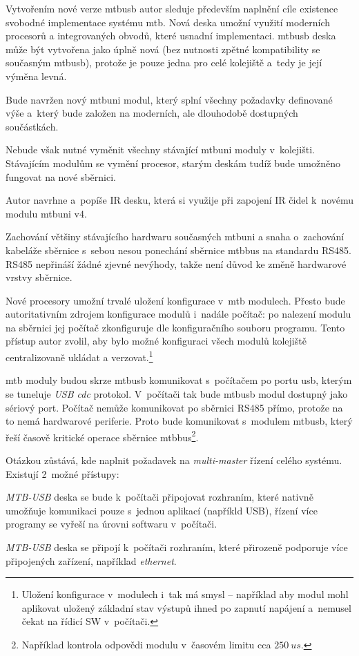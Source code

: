 Vytvořením nové verze \gls{mtbusb} autor sleduje především
naplnění cíle existence svobodné implementace systému \gls{mtb}. Nová deska
umožní využití moderních procesorů a integrovaných obvodů, které usnadní
implementaci. \gls{mtbusb} deska může být vytvořena jako úplně nová (bez nutnosti
zpětné kompatibility se současným \gls{mtbusb}), protože je pouze jedna pro
celé kolejiště a~tedy je její výměna levná.

Bude navržen nový \gls{mtbuni} modul, který splní všechny požadavky definované
výše a~který bude založen na moderních, ale dlouhodobě dostupných součástkách.

Nebude však nutné vyměnit všechny stávající \gls{mtbuni} moduly v~kolejišti.
Stávajícím modulům se vymění procesor, starým deskám tudíž bude umožněno
fungovat na nové sběrnici.

Autor navrhne a~popíše IR desku, která si využije při zapojení IR čidel
k~novému modulu \gls{mtbuni} v4.

Zachování většiny stávajícího hardwaru současných \gls{mtbuni} a snaha
o~zachování kabeláže sběrnice s~sebou nesou ponechání sběrnice \gls{mtbbus}
na standardu RS485. RS485 nepřináší žádné zjevné nevýhody, takže není důvod
ke změně hardwarové vrstvy sběrnice.

Nové procesory umožní trvalé uložení konfigurace v~\gls{mtb} modulech.
Přesto bude autoritativním zdrojem konfigurace modulů i~nadále počítač: po
nalezení modulu na sběrnici jej počítač zkonfiguruje dle konfiguračního
souboru programu. Tento přístup autor zvolil, aby bylo možné konfiguraci všech
modulů kolejiště centralizovaně ukládat a verzovat.\footnote{Uložení konfigurace
v~modulech i~tak má smysl – například aby modul mohl aplikovat uložený základní
stav výstupů ihned po zapnutí napájení a~nemusel čekat na řídicí SW
v~počítači.}

\gls{mtb} moduly budou skrze \gls{mtbusb} komunikovat s~počítačem po portu
\gls{usb}, kterým se tuneluje \textit{USB \gls{cdc}} protokol. V~počítači tak bude
\gls{mtbusb} modul dostupný jako sériový port. Počítač nemůže komunikovat po
sběrnici RS485 přímo, protože na to nemá hardwarové periferie. Proto bude
komunikovat s~modulem \gls{mtbusb}, který řeší časově kritické operace
sběrnice \gls{mtbbus}\footnote{Například kontrola odpovědi modulu v~časovém
limitu cca $250~us$.}.

Otázkou zůstává, kde naplnit požadavek na \textit{multi-master} řízení celého
systému. Existují 2~možné přístupy:

\begin{compactenum}
\item \textit{MTB-USB} deska se bude k~počítači připojovat rozhraním, které
	nativně umožňuje komunikaci pouze s~jednou aplikací (napříkld USB), řízení
	více programy se vyřeší na úrovni softwaru v~počítači.
\item \textit{MTB-USB} deska se připojí k~počítači rozhraním, které přirozeně
	podporuje více připojených zařízení, například \textit{ethernet}.
\end{compactenum}

